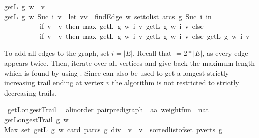 \begin{isabellebody}
{\isachardoublequoteopen}getL\ g\ w\ {}\ v\ {\isacharequal}\ {}{\isachardoublequoteclose}\ {\isacharbar}\ \ \isanewline
{\isachardoublequoteopen}getL\ g\ w\ {\isacharparenleft}Suc\ i{\isacharparenright}\ v\ {\isacharequal}\ {\isacharparenleft}let\ {\isacharparenleft}vv\ {\isacharequal}\ {\isacharparenleft}findEdge\ w\ {\isacharparenleft}set{\isacharunderscore}to{\isacharunderscore}list\ {\isacharparenleft}arcs\ g{\isacharparenright}{\isacharparenright}\ {\isacharparenleft}Suc\ i{\isacharparenright}{\isacharparenright}\ in\ \isanewline
\ \ \ \ \ \ \ \ \ \ {\isacharparenleft}if\ v\ {\isacharequal}\ v\ then\ max\ {\isacharparenleft}{\isacharparenleft}getL\ g\ w\ i\ v\ {\isacharparenleft}getL\ g\ w\ i\ v{\isacharparenright}\ else\ \isanewline
\ \ \ \ \ \ \ \ \ \ {\isacharparenleft}if\ v\ {\isacharequal}\ v\ then\ max\ {\isacharparenleft}{\isacharparenleft}getL\ g\ w\ i\ v\ {\isacharparenleft}getL\ g\ w\ i\ v{\isacharparenright}\ else\ getL\ g\ w\ i\ v{\isacharparenright}{\isacharparenright}{\isacharparenright}{\isachardoublequoteclose}%
\begin{isamarkuptext}%
To add all edges to the graph, set $i=|E|$. Recall that  $= 2*|E|$, 
as every edge appears twice. 
Then, iterate over all vertices and give back the
maximum length which is found by using . Since  can also be used to get a longest 
strictly increasing trail ending at vertex $v$ the algorithm is not restricted to strictly decreasing trails.%
\end{isamarkuptext}\isamarkuptrue%
\isamarkupfalse%
\ getLongestTrail\ {\isacharcolon}{\isacharcolon}\ \isanewline
{\isachardoublequoteopen}{\isacharparenleft}{\isacharprime}a{\isacharcolon}{\isacharcolon}linorder{\isacharparenright}\ pair{\isacharunderscore}pre{\isacharunderscore}digraph\ {\isasymRightarrow}\ {\isacharparenleft}{\isacharprime}a{\isasymtimes}{\isacharprime}a{\isacharparenright}\ weight{\isacharunderscore}fun\ {\isasymRightarrow}\ nat{\isachardoublequoteclose}\ \isanewline
{\isachardoublequoteopen}getLongestTrail\ g\ w\ {\isacharequal}\ \isanewline
Max\ {\isacharparenleft}set\ {\isacharbrackleft}{\isacharparenleft}getL\ g\ w\ {\isacharparenleft}card\ {\isacharparenleft}parcs\ g{\isacharparenright}\ div\ {}{\isacharparenright}\ v{\isacharparenright}\ {\isachardot}\ v\ {\isacharless}{\isacharminus}\ sorted{\isacharunderscore}list{\isacharunderscore}of{\isacharunderscore}set\ {\isacharparenleft}pverts\ g{\isacharparenright}{\isacharbrackright}{\isacharparenright}{\isachardoublequoteclose}%

\end{isabellebody}
